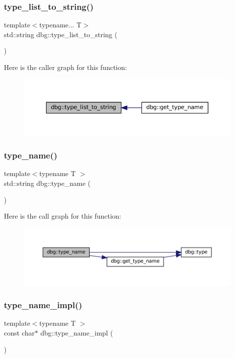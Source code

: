 \subsubsection{\texorpdfstring{type\+\_\+list\+\_\+to\+\_\+string()}{type\_list\_to\_string()}}
{\footnotesize\ttfamily template$<$typename... T$>$ \\
std\+::string dbg\+::type\+\_\+list\+\_\+to\+\_\+string (\begin{DoxyParamCaption}{ }\end{DoxyParamCaption})}

Here is the caller graph for this function\+:
\nopagebreak
\begin{figure}[H]
\begin{center}
\leavevmode
\includegraphics[width=350pt]{namespacedbg_aef0097e53230ee373eaabc4981048cac_icgraph}
\end{center}
\end{figure}
\mbox{\label{namespacedbg_aab63fa619583229308f148088ffac7a0}} 
\subsubsection{\texorpdfstring{type\+\_\+name()}{type\_name()}}
{\footnotesize\ttfamily template$<$typename T $>$ \\
std\+::string dbg\+::type\+\_\+name (\begin{DoxyParamCaption}{ }\end{DoxyParamCaption})}

Here is the call graph for this function\+:
\nopagebreak
\begin{figure}[H]
\begin{center}
\leavevmode
\includegraphics[width=350pt]{namespacedbg_aab63fa619583229308f148088ffac7a0_cgraph}
\end{center}
\end{figure}
\mbox{\label{namespacedbg_aaf90b7c26aa95f1666f2446996973cac}} 
\subsubsection{\texorpdfstring{type\+\_\+name\+\_\+impl()}{type\_name\_impl()}}
{\footnotesize\ttfamily template$<$typename T $>$ \\
const char$\ast$ dbg\+::type\+\_\+name\+\_\+impl (\begin{DoxyParamCaption}{ }\end{DoxyParamCaption})}

